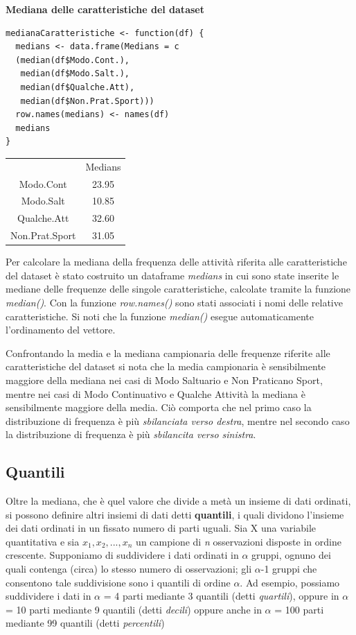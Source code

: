 \vspace{5mm}
\noindent \textbf{Mediana delle caratteristiche del dataset}

\begin{lstlisting}
medianaCaratteristiche <- function(df) {
  medians <- data.frame(Medians = c
  (median(df$Modo.Cont.),
   median(df$Modo.Salt.),
   median(df$Qualche.Att),
   median(df$Non.Prat.Sport)))
  row.names(medians) <- names(df)
  medians
}
\end{lstlisting}

\vspace{5mm}
\begin{tabular}{ c c}
  & Medians\\
 Modo.Cont & 23.95\\ 
 Modo.Salt & 10.85\\
 Qualche.Att & 32.60\\ 
 Non.Prat.Sport & 31.05\\ 
\end{tabular}
\vspace{5mm}

Per calcolare la mediana della frequenza delle attività riferita alle caratteristiche del dataset è stato costruito un dataframe \textit{medians} in cui sono state inserite le mediane delle frequenze delle singole caratteristiche, calcolate tramite la funzione \textit{median()}. Con la funzione \textit{row.names()} sono stati associati i nomi delle relative caratteristiche. Si noti che la funzione \textit{median()} esegue automaticamente l'ordinamento del vettore.

Confrontando la media e la mediana campionaria delle frequenze riferite alle caratteristiche del dataset si nota che la media campionaria è sensibilmente maggiore della mediana nei casi di Modo Saltuario e Non Praticano Sport, mentre nei casi di Modo Continuativo e Qualche Attività la mediana è sensibilmente maggiore della media. Ciò comporta che nel primo caso la distribuzione di frequenza è più \textit{sbilanciata verso destra}, mentre nel secondo caso la distribuzione di frequenza è più \textit{sbilancita verso sinistra}.


\subsection{Quantili}\label{cap3.1.3}

Oltre la mediana, che è quel valore che divide a metà un insieme di dati ordinati, si possono definire altri insiemi di dati detti \textbf{quantili}, i quali dividono l'insieme dei dati ordinati in un fissato numero di parti uguali. Sia X una variabile quantitativa e sia $x_1, x_2, ..., x_n$ un campione di \textit{n} osservazioni disposte in ordine crescente. Supponiamo di suddividere i dati ordinati in $\alpha$ gruppi, ognuno dei quali contenga (circa) lo stesso numero di osservazioni; gli $\alpha$-1 gruppi che consentono tale suddivisione sono i quantili di ordine $\alpha$. Ad esempio, possiamo suddividere i dati in $\alpha$ = 4 parti mediante 3 quantili (detti \textit{quartili}), oppure in $\alpha$ = 10 parti mediante 9 quantili (detti \textit{decili}) oppure anche in $\alpha$ = 100 parti mediante 99 quantili (detti \textit{percentili})

